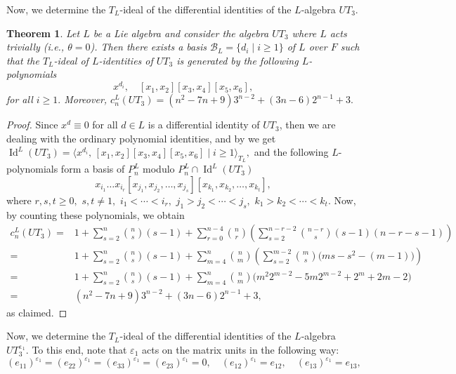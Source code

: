 \documentclass[a4paper,reqno]{amsart}
\newtheorem{theorem}{Theorem}
\theoremstyle{definition}
\numberwithin{equation}{section}
\numberwithin{theorem}{section}
\DeclareMathOperator{\I}{Id}
\DeclareMathOperator{\e}{\varepsilon}
\begin{document}
Now, we determine the $T_L$-ideal of the differential identities of the $L$-algebra $UT_3.$

\begin{theorem}\label{Teo: Id^L UT_3 ordinarie}
Let $L$ be a Lie algebra and consider the algebra $UT_3$ where $L$ acts trivially (i.e., $\theta=0$). Then 
there exists a basis $\mathcal{B}_L=\{d_i \mid i \geq 1\}$ of $L$ over $F$ such that 
the $T_L$-ideal of $L$-identities of $UT_3$ is generated by the following $L$-polynomials
$$x^{d_i}, \quad  [x_1,x_2][x_3,x_4][x_5,x_6],$$
for all  $i\geq 1.$ Moreover, $c_n^L(UT_3)=(n^2-7n+9) 3^{n-2}+ (3n-6)2^{n-1}+3.$ 
\end{theorem}
\begin{proof}
     Since $x^d\equiv 0$ for all $d\in L$ is a differential identity of $UT_3$, then we are dealing with the ordinary polynomial identities, and by \cite[Theorem 5.2.1]{Drenskybook} we get $\I^L(UT_3)=\langle x^{d_i}, \, [x_1,x_2][x_3,x_4][x_5,x_6] \mid i\geq 1\rangle_{T_L},$
and  the following $L$-polynomials form a basis of $P_{n}^L$ modulo $P_{n}^L\cap \I^L(UT_3)$
\begin{equation*}
x_{i_{1}}\dots x_{i_{r}}[x_{j_1},x_{j_2},\dots,x_{j_s}][x_{k_1},x_{k_2},\dots,x_{k_t}],
\end{equation*}
where $r,s,t \geq 0,$ $s,t\neq 1,$  $i_1< \cdots < i_r,$ $j_1>j_2<  \cdots < j_s,$ $k_1>k_2<  \cdots < k_t.$
Now, by counting these polynomials, we obtain
     \begin{align*}
         c_n^L(UT_3)= & 1+ \sum_{s=2}^n \binom{n}{s}(s-1) + \sum_{r=0}^{n-4}\binom{n}{r}\left( \sum_{s=2}^{n-r-2}\binom{n-r}{s}(s-1)(n-r-s-1)\right)\\
        = & 1+ \sum_{s=2}^n \binom{n}{s}(s-1) + \sum_{m=4}^{n}\binom{n}{m}\left( \sum_{s=2}^{m-2}\binom{m}{s}\big(ms-s^2-(m-1)\big)\right)\\
          =& 1+ \sum_{s=2}^n \binom{n}{s}(s-1) + \sum_{m=4}^{n}\binom{n}{m}\Big(m^2 2^{m-2}-5m2^{m-2}+2^{m}+2m-2\Big)\\
          =& (n^2-7n+9) 3^{n-2}+ (3n-6)2^{n-1}+3,
     \end{align*}
     as claimed.
\end{proof}

Now, we determine the $T_L$-ideal of the differential identities of the $L$-algebra $UT_3^{\e_1}.$ 
To this end, note that $ \varepsilon_1 $ acts on the matrix units in the following way:
\begin{equation}
    (e_{11})^{\varepsilon_1} = (e_{22})^{\varepsilon_1} = (e_{33})^{\varepsilon_1} = (e_{23})^{\varepsilon_1} = 0, \quad (e_{12})^{\varepsilon_1} = e_{12}, \quad (e_{13})^{\varepsilon_1} = e_{13}, \label{eq: e1}
\end{equation}
\end{document}
